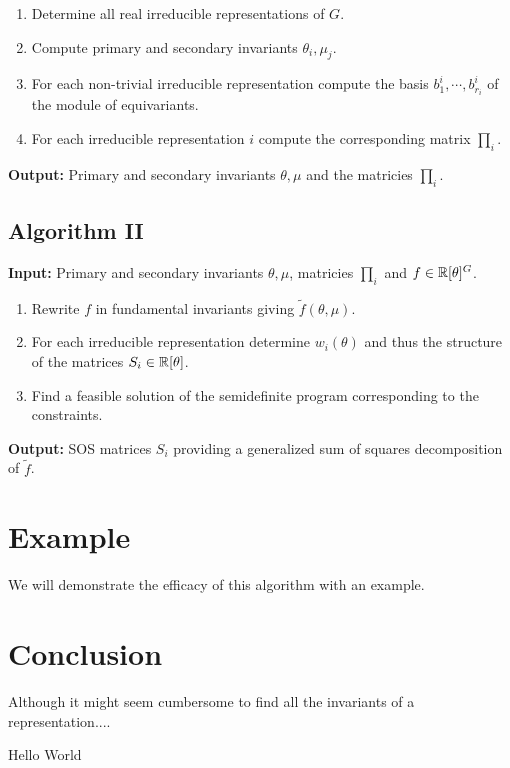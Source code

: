 \documentclass[]{article}
\begin{document}
\begin{enumerate}
    \item Determine all real irreducible representations of $G$.
    \item Compute primary and secondary invariants $\theta_i,\mu_j$. 
    \item For each non-trivial irreducible representation compute the basis $b_1^i,\cdots, b_{r_i}^i$ of the module of equivariants.
    \item For each irreducible representation $i$ compute the corresponding matrix $\prod_i$.
\end{enumerate}
\noindent
\textbf{Output:} Primary and secondary invariants $\theta,\mu$ and the matricies $\prod_i$.


\subsection*{Algorithm II}

\textbf{Input: } Primary and secondary invariants $\theta,\mu$, matricies $\prod_i$ and $f \in \mathbb R[\theta]^G$.

\begin{enumerate}
    \item Rewrite $f$ in fundamental invariants giving $\tilde{f}(\theta,\mu)$.
    \item For each irreducible representation determine $w_i(\theta)$ and thus the structure of the matrices $S_i\in \mathbb R[\theta]$.
    \item Find a feasible solution of the semidefinite program corresponding to the constraints.
\end{enumerate}
\noindent
\textbf{Output:} SOS matrices $S_i$ providing a generalized sum of squares decomposition of $\tilde{f}$.

\section{Example}
We will demonstrate the efficacy of this algorithm with an example.
\section{Conclusion}
Although it might seem cumbersome to find all the invariants of a representation.... 

\cite{Gatermann_2004}


Hello World
\end{document}
